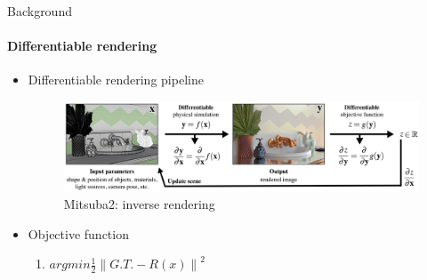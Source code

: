 \documentclass[beamer]{standalone}
\begin{document}
\begin{frame}{Background}
\framesubtitle{Differentiable rendering}

\begin{itemize}
    \item Differentiable rendering pipeline
    \begin{figure}[h]
        \includegraphics[width=0.8\linewidth]{figures/background-figure-2.jpeg}
        \caption{Mitsuba2: inverse rendering}
    \end{figure}
    \item Objective function
    \begin{enumerate}
        \item $ argmin \frac{1}{2} \left\lVert G.T. - R(x) \right\rVert^{2}  $
    \end{enumerate}

\end{itemize}

\end{frame}
\end{document}
